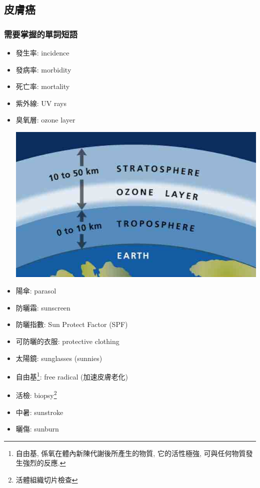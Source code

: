 \subsection{皮膚癌}
\subsubsection*{需要掌握的單詞短語}
\begin{multicols}{3}
\begin{itemize}
  \itemsep0em
  \item 發生率: incidence
  \item 發病率: morbidity
  \item 死亡率: mortality
  \item 紫外線: UV rays
  \item 臭氧層: ozone layer
  \begin{center}
    \includegraphics[scale=.25]{pics/ozone-layer}
  \end{center}
  \item 陽傘: parasol
  \item 防曬霜: sunscreen
  \item 防曬指數: Sun Protect Factor (SPF)
  \item 可防曬的衣服: protective clothing
  \item 太陽鏡: sunglasses (sunnies)
  \item 自由基\footnote{自由基, 係氧在體內新陳代謝後所產生的物質, 它的活性極強, 可與任何物質發生強烈的反應.}: free radical (加速皮膚老化)
  \item 活檢: biopsy\footnote{活體組織切片檢查}
  \item 中暑: sunstroke
  \item 曬傷: sunburn

\end{itemize}
\end{multicols}
